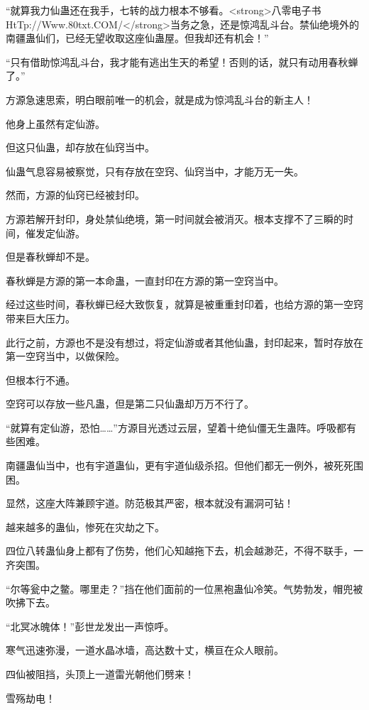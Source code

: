 
\begin{this_body}

“就算我力仙蛊还在我手，七转的战力根本不够看。<strong>八零电子书HtTp://Www.80txt.COM/</strong>当务之急，还是惊鸿乱斗台。禁仙绝境外的南疆蛊仙们，已经无望收取这座仙蛊屋。但我却还有机会！”

“只有借助惊鸿乱斗台，我才能有逃出生天的希望！否则的话，就只有动用春秋蝉了。”

方源急速思索，明白眼前唯一的机会，就是成为惊鸿乱斗台的新主人！

他身上虽然有定仙游。

但这只仙蛊，却存放在仙窍当中。

仙蛊气息容易被察觉，只有存放在空窍、仙窍当中，才能万无一失。

然而，方源的仙窍已经被封印。

方源若解开封印，身处禁仙绝境，第一时间就会被消灭。根本支撑不了三瞬的时间，催发定仙游。

但是春秋蝉却不是。

春秋蝉是方源的第一本命蛊，一直封印在方源的第一空窍当中。

经过这些时间，春秋蝉已经大致恢复，就算是被重重封印着，也给方源的第一空窍带来巨大压力。

此行之前，方源也不是没有想过，将定仙游或者其他仙蛊，封印起来，暂时存放在第一空窍当中，以做保险。

但根本行不通。

空窍可以存放一些凡蛊，但是第二只仙蛊却万万不行了。

“就算有定仙游，恐怕……”方源目光透过云层，望着十绝仙僵无生蛊阵。呼吸都有些困难。

南疆蛊仙当中，也有宇道蛊仙，更有宇道仙级杀招。但他们都无一例外，被死死围困。

显然，这座大阵兼顾宇道。防范极其严密，根本就没有漏洞可钻！

越来越多的蛊仙，惨死在灾劫之下。

四位八转蛊仙身上都有了伤势，他们心知越拖下去，机会越渺茫，不得不联手，一齐突围。

“尔等瓮中之鳖。哪里走？”挡在他们面前的一位黑袍蛊仙冷笑。气势勃发，帽兜被吹拂下去。

“北冥冰魄体！”彭世龙发出一声惊呼。

寒气迅速弥漫，一道水晶冰墙，高达数十丈，横亘在众人眼前。

四仙被阻挡，头顶上一道雷光朝他们劈来！

雪殇劫电！


\end{this_body}
